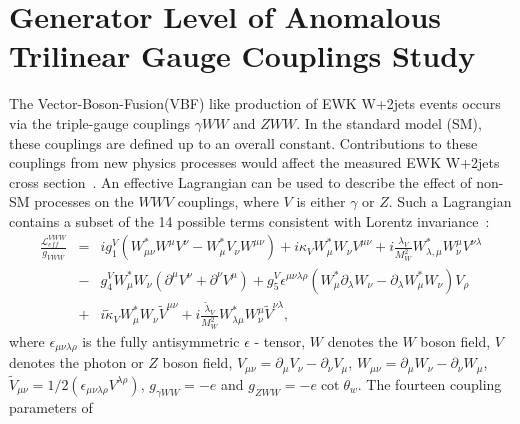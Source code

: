 \clearpage{}
\section{Generator Level of Anomalous Trilinear Gauge Couplings Study}
\label{app:atgc}

The Vector-Boson-Fusion(VBF) like production of EWK W+2jets events occurs via the triple-gauge couplings 
$\gamma{WW}$ and $ZWW$. In the standard model (SM), these couplings are defined up to 
an overall constant. Contributions to these couplings from new physics processes 
would affect the measured EWK W+2jets cross section~\cite{Hagiwara1987253}. An effective 
Lagrangian can be used to describe the effect of non-SM processes on the $WWV$ 
couplings, where $V$ is either $\gamma$ or $Z$. Such a Lagrangian contains a 
subset of the 14 possible terms consistent with Lorentz invariance~\cite{Hagiwara1987253}:
\begin{equation}
   \begin{array}{ccl}
    \frac{{\mathcal L}_{eff}^{VWW}}{g_{VWW}} & = & i g_{1}^{V} (W_{\mu\nu}^{*}W^{\mu}V^{\nu} - 
     W_{\mu}^{*}V_{\nu}W^{\mu\nu})+i{\kappa}_{V}W_{\mu}^{*}W_{\nu}V^{\mu\nu} + 
     i\frac{\lambda_{V}}{M_{W}^{2}} W_{\lambda,\mu}^{*}W_{\nu}^{\mu}V^{\nu\lambda} \\ & - 
     & g_{4}^{V}W_{\mu}^{*}W_{\nu}(\partial^{\mu}V^{\nu} + \partial^{\nu}V^{\mu}) + 
     g_{5}^{V}\epsilon^{\mu\nu\lambda\rho}(W_{\mu}^{*}\partial_{\lambda}W_{\nu} -
     \partial_{\lambda}W^{*}_{\mu}W_{\nu})V_{\rho} \\ & + 
     & i\tilde{\kappa}_{V}W^{*}_{\mu}W_{\nu}\tilde{V}^{\mu\nu} + 
     i\frac{\tilde{\lambda}_{V}}{M_{W}^{2}}W^{*}_{\lambda\mu}W^{\mu}_{\nu}\tilde{V}^{\nu\lambda},
   \label{eq:effLang}
  \end{array}{}
  \end{equation}
  where $\epsilon_{\mu\nu\lambda\rho}$ is the fully antisymmetric $\epsilon$ - tensor, 
  $W$ denotes the $W$ boson field, $V$ denotes the photon or $Z$ boson field, 
  $V_{\mu\nu}=\partial_{\mu}V_{\nu}-\partial_{\nu}V_{\mu}$, 
  $W_{\mu\nu}=\partial_{\mu}W_{\nu}-\partial_{\nu}W_{\mu}$, 
  $\tilde{V}_{\mu\nu}=1/2(\epsilon_{\mu\nu\lambda\rho}V^{\lambda\rho})$, 
  $g_{\gamma{WW}}=-e$ and $g_{ZWW}=-e\cot\theta_{w}$.  The fourteen coupling parameters of 
